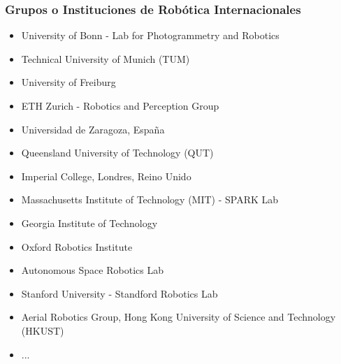 \begin{frame}
    \frametitle{Grupos o Instituciones de Robótica Internacionales}
    
   \begin{itemize}
       \item University of Bonn - Lab for Photogrammetry and Robotics
       \item Technical University of Munich (TUM)
       \item University of Freiburg
       \item ETH Zurich - Robotics and Perception Group
       \item Universidad de Zaragoza, España
       \item Queensland University of Technology (QUT)
       \item Imperial College, Londres, Reino Unido
       \item Massachusetts Institute of Technology (MIT) - SPARK Lab
       \item Georgia Institute of Technology
       \item Oxford Robotics Institute
       \item Autonomous Space Robotics Lab
       \item Stanford University - Standford Robotics Lab
       \item Aerial Robotics Group, Hong Kong University of Science and Technology (HKUST)
       \item ...
   \end{itemize}
   
\end{frame}

